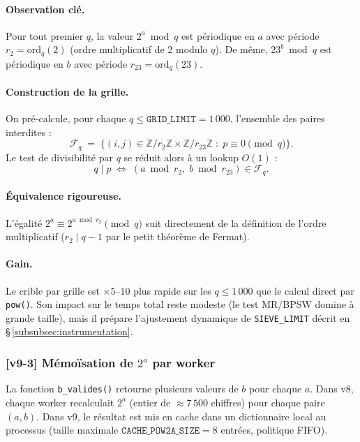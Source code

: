 \paragraph{Observation clé.}
Pour tout premier $q$, la valeur $2^a \bmod q$ est périodique en $a$ avec période
$r_2 = \mathrm{ord}_q(2)$ (ordre multiplicatif de 2 modulo $q$). De même,
$23^b \bmod q$ est périodique en $b$ avec période $r_{23} = \mathrm{ord}_q(23)$.

\paragraph{Construction de la grille.}
On pré-calcule, pour chaque $q \leq \texttt{GRID\_LIMIT} = 1\,000$, l'ensemble des
paires interdites :
\[
  \mathcal{F}_q \;=\; \bigl\{(i,j)\in \mathbb{Z}/r_2\mathbb{Z}\times\mathbb{Z}/r_{23}\mathbb{Z}
  \;:\; p \equiv 0 \pmod{q}\bigr\}.
\]
Le test de divisibilité par $q$ se réduit alors à un lookup $O(1)$ :
\[
  q \mid p \;\iff\; (a \bmod r_2,\; b \bmod r_{23}) \in \mathcal{F}_q.
\]

\paragraph{Équivalence rigoureuse.}
L'égalité $2^a \equiv 2^{a \bmod r_2} \pmod{q}$ suit directement de la définition
de l'ordre multiplicatif ($r_2 \mid q-1$ par le petit théorème de Fermat).

\paragraph{Gain.}
Le crible par grille est $\times 5$--$10$ plus rapide sur les $q \leq 1\,000$ que
le calcul direct par \texttt{pow()}. Son impact sur le temps total reste modeste
(le test MR/BPSW domine à grande taille), mais il prépare l'ajustement dynamique
de \texttt{SIEVE\_LIMIT} décrit en §\,\ref{subsubsec:instrumentation}.

\subsubsection{[v9-3] Mémoïsation de $2^a$ par worker}

La fonction \texttt{b\_valides()} retourne plusieurs valeurs de $b$ pour chaque $a$.
Dans v8, chaque worker recalculait $2^a$ (entier de $\approx 7\,500$ chiffres) pour
chaque paire $(a,b)$. Dans v9, le résultat est mis en cache dans un dictionnaire
local au processus (taille maximale $\texttt{CACHE\_POW2A\_SIZE} = 8$ entrées, politique FIFO).

